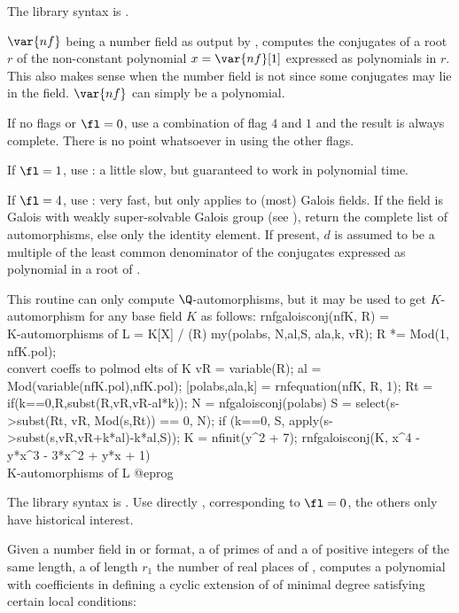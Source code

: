 The library syntax is .

\label{se:nfgaloisconj}
$\var{nf}$ being a number field as output by , computes the
conjugates of a root $r$ of the non-constant polynomial $x=\var{nf}[1]$
expressed as polynomials in $r$. This also makes sense when the number field
is not  since some conjugates may lie in the field.
$\var{nf}$ can simply be a polynomial.

If no flags or $\fl=0$, use a combination of flag $4$ and $1$ and the result
is always complete. There is no point whatsoever in using the other flags.

If $\fl=1$, use : a little slow, but guaranteed to work in
polynomial time.

If $\fl=4$, use : very fast, but only applies to (most)
Galois fields. If the field is Galois with weakly super-solvable Galois
group (see ), return the complete list of automorphisms, else
only the identity element. If present, $d$ is assumed to be a multiple of the
least common denominator of the conjugates expressed as polynomial in a root
of .

This routine can only compute $\Q$-automorphisms, but it may be used to get
$K$-automorphism for any base field $K$ as follows:
\bprog
rnfgaloisconj(nfK, R) = \\ K-automorphisms of L = K[X] / (R)
{
  my(polabs, N,al,S, ala,k, vR);
  R *= Mod(1, nfK.pol); \\ convert coeffs to polmod elts of K
  vR = variable(R);
  al = Mod(variable(nfK.pol),nfK.pol);
  [polabs,ala,k] = rnfequation(nfK, R, 1);
  Rt = if(k==0,R,subst(R,vR,vR-al*k));
  N = nfgaloisconj(polabs) %
  S = select(s->subst(Rt, vR, Mod(s,Rt)) == 0, N);
  if (k==0, S, apply(s->subst(s,vR,vR+k*al)-k*al,S));
}
K  = nfinit(y^2 + 7);
rnfgaloisconj(K, x^4 - y*x^3 - 3*x^2 + y*x + 1)  \\ K-automorphisms of L
@eprog

The library syntax is .
Use directly
, corresponding to $\fl = 0$, the others
only have historical interest.

\label{se:nfgrunwaldwang}
Given  a number field in  or  format,
a   of primes of  and a   of
positive integers of the same length, a   of length
$r_1$ the number of real places of , computes a polynomial with
coefficients in  defining a cyclic extension of  of
minimal degree satisfying certain local conditions:

